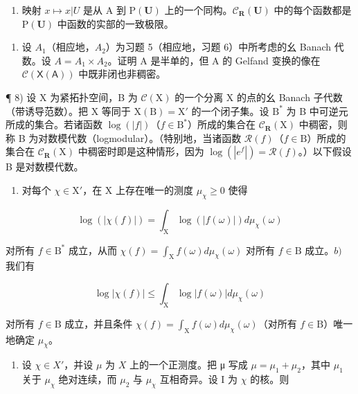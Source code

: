 \begin{enumerate}
\def\labelenumi{\alph{enumi})}
\setcounter{enumi}{4}
\tightlist
\item
  映射 \(x \mapsto x|U\) 是从 A 到 \(\mathrm{P}(\mathbf{U})\) 上的一个同构。\(\mathcal{C}_{\mathbf{R}}(\mathbf{U})\) 中的每个函数都是 \(\mathrm{P}(\mathbf{U})\) 中函数的实部的一致极限。
\end{enumerate}

\begin{enumerate}
\def\labelenumi{\arabic{enumi})}
\setcounter{enumi}{6}
\tightlist
\item
  设 \(A_{1}\)（相应地，\(A_{2}\)）为习题 5（相应地，习题 6）中所考虑的幺 Banach 代数。设 \(A = A_{1} \times A_{2}\)。证明 A 是半单的，但 A 的 Gelfand 变换的像在 \(\mathcal{C}(\mathsf{X}(\mathsf{A}))\) 中既非闭也非稠密。
\end{enumerate}

¶ 8) 设 X 为紧拓扑空间，B 为 \(\mathcal{C}(\mathrm{X})\) 的一个分离 X 的点的幺 Banach 子代数（带诱导范数）。把 X 等同于 \(\mathrm{X(B)} = \mathrm{X}'\) 的一个闭子集。设 \(\mathrm{B}^*\) 为 B 中可逆元所成的集合。若诸函数 \(\log(|f|)\)（\(f \in \mathrm{B}^*\)）所成的集合在 \(\mathcal{C}_{\mathbf{R}}(\mathrm{X})\) 中稠密，则称 B 为对数模代数（logmodular）。（特别地，当诸函数 \(\mathcal{R}(f)\)（\(f \in \mathrm{B}\)）所成的集合在 \(\mathcal{C}_{\mathbf{R}}(\mathrm{X})\) 中稠密时即是这种情形，因为 \(\log(|e^f|) = \mathcal{R}(f)\)。）以下假设 B 是对数模代数。

\begin{enumerate}
\def\labelenumi{\alph{enumi})}
\tightlist
\item
  对每个 \(\chi \in \mathrm{X}'\)，在 X 上存在唯一的测度 \(\mu_{\chi} \geqslant 0\) 使得
\end{enumerate}

\[
\log (| \chi (f) |) = \int_ {\mathrm{X}} \log (| f (\omega) |) d \mu_ {\chi} (\omega)
\]

对所有 \(f \in \mathrm{B}^*\) 成立，从而 \(\chi(f) = \int_{\mathrm{X}} f(\omega) d\mu_{\chi}(\omega)\) 对所有 \(f \in \mathrm{B}\) 成立。\(b)\) 我们有

\[
\log | \chi (f) | \leqslant \int_ {\mathrm{X}} \log | f (\omega) | d \mu_ {\chi} (\omega)
\]

对所有 \(f \in \mathrm{B}\) 成立，并且条件 \(\chi(f) = \int_{\mathrm{X}} f(\omega) d\mu_{\chi}(\omega)\)（对所有 \(f \in \mathrm{B}\)）唯一地确定 \(\mu_{\chi}\)。

\begin{enumerate}
\def\labelenumi{\alph{enumi})}
\setcounter{enumi}{2}
\tightlist
\item
  设 \(\chi \in X'\)，并设 \(\mu\) 为 \(X\) 上的一个正测度。把 μ 写成 \(\mu = \mu_1 + \mu_2\)，其中 \(\mu_1\) 关于 \(\mu_{\chi}\) 绝对连续，而 \(\mu_2\) 与 \(\mu_{\chi}\) 互相奇异。设 I 为 \(\chi\) 的核。则
\end{enumerate}

